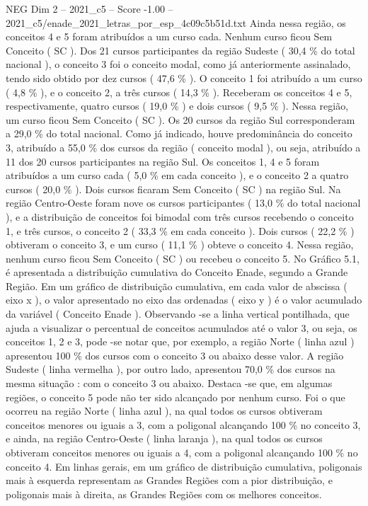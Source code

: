 \begin{textsample}{NEG Dim 2 – 2021\_c5 – Score -1.00 – 2021\_c5/enade\_2021\_letras\_por\_esp\_4c09c5b51d.txt}
Ainda nessa região, os conceitos 4 e 5 foram atribuídos a um curso cada.
Nenhum curso ficou Sem Conceito ( SC ).
Dos 21 cursos participantes da região Sudeste ( 30,4 \% do total nacional ), o conceito 3 foi o conceito modal, como já anteriormente assinalado, tendo sido obtido por dez cursos ( 47,6 \% ).
O conceito 1 foi atribuído a um curso ( 4,8 \% ), e o conceito 2, a três cursos ( 14,3 \% ).
Receberam os conceitos 4 e 5, respectivamente, quatro cursos ( 19,0 \% ) e dois cursos ( 9,5 \% ).
Nessa região, um curso ficou Sem Conceito ( SC ).
Os 20 cursos da região Sul corresponderam a 29,0 \% do total nacional.
Como já indicado, houve predominância do conceito 3, atribuído a 55,0 \% dos cursos da região ( conceito modal ), ou seja, atribuído a 11 dos 20 cursos participantes na região Sul.
Os conceitos 1, 4 e 5 foram atribuídos a um curso cada ( 5,0 \% em cada conceito ), e o conceito 2 a quatro cursos ( 20,0 \% ).
Dois cursos ficaram Sem Conceito ( SC ) na região Sul.
Na região Centro-Oeste foram nove os cursos participantes ( 13,0 \% do total nacional ), e a distribuição de conceitos foi bimodal com três cursos recebendo o conceito 1, e três cursos, o conceito 2 ( 33,3 \% em cada conceito ).
Dois cursos ( 22,2 \% ) obtiveram o conceito 3, e um curso ( 11,1 \% ) obteve o conceito 4.
Nessa região, nenhum curso ficou Sem Conceito ( SC ) ou recebeu o conceito 5.
No Gráfico 5.1, é apresentada a distribuição cumulativa do Conceito Enade, segundo a Grande Região.
Em um gráfico de distribuição cumulativa, em cada valor de abscissa ( eixo x ), o valor apresentado no eixo das ordenadas ( eixo y ) é o valor acumulado da variável ( Conceito Enade ).
Observando -se a linha vertical pontilhada, que ajuda a visualizar o percentual de conceitos acumulados até o valor 3, ou seja, os conceitos 1, 2 e 3, pode -se notar que, por exemplo, a região Norte ( linha azul ) apresentou 100 \% dos cursos com o conceito 3 ou abaixo desse valor.
A região Sudeste ( linha vermelha ), por outro lado, apresentou 70,0 \% dos cursos na mesma situação : com o conceito 3 ou abaixo.
Destaca -se que, em algumas regiões, o conceito 5 pode não ter sido alcançado por nenhum curso.
Foi o que ocorreu na região Norte ( linha azul ), na qual todos os cursos obtiveram conceitos menores ou iguais a 3, com a poligonal alcançando 100 \% no conceito 3, e ainda, na região Centro-Oeste ( linha laranja ), na qual todos os cursos obtiveram conceitos menores ou iguais a 4, com a poligonal alcançando 100 \% no conceito 4.
Em linhas gerais, em um gráfico de distribuição cumulativa, poligonais mais à esquerda representam as Grandes Regiões com a pior distribuição, e poligonais mais à direita, as Grandes Regiões com os melhores conceitos.

\end{textsample}
